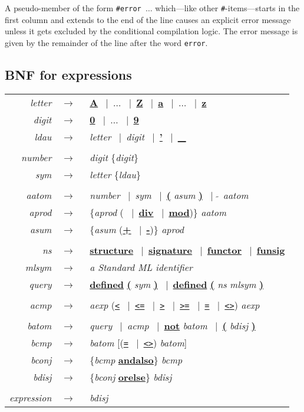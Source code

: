 \documentclass{article}
\newcommand{\nt}[1]{{\it #1}}
\newcommand{\tl}[1]{{\underline{\bf #1}}}
\newcommand{\ttl}[1]{{\underline{\tt #1}}}
\newcommand{\ar}{$\rightarrow$\ }
\newcommand{\vb}{~$|$~}
\begin{document}
A pseudo-member of the form {\tt \#error $\ldots$} which---like other
{\tt \#}-items---starts in the first column and extends to the end of
the line causes an explicit error message unless it gets excluded by
the conditional compilation logic.  The error message is given by the
remainder of the line after the word {\tt error}.

\subsection{BNF for expressions}

\begin{tabular}{rcl}
\nt{letter} &\ar& \tl{A} \vb $\ldots$ \vb \tl{Z} \vb \tl{a} \vb $\ldots$ \vb \tl{z} \\
\nt{digit}  &\ar& \tl{0} \vb $\ldots$ \vb \tl{9} \\
\nt{ldau}   &\ar& \nt{letter} \vb \nt{digit} \vb \tl{'} \vb \tl{\_} \\
\\
\nt{number} &\ar& \nt{digit} \{\nt{digit}\} \\
\nt{sym}    &\ar& \nt{letter} \{\nt{ldau}\} \\
\\
\nt{aatom}  &\ar& \nt{number} \vb \nt{sym} \vb \tl{(} \nt{asum} \tl{)} \vb \tl{$\tilde{~}$} \nt{aatom} \\
\nt{aprod}  &\ar& \{\nt{aprod} (\tl{*} \vb \tl{div} \vb \tl{mod})\} \nt{aatom} \\
\nt{asum}   &\ar& \{\nt{asum} (\tl{+} \vb \tl{-})\} \nt{aprod} \\
\\
\nt{ns}     &\ar& \tl{structure} \vb \tl{signature} \vb \tl{functor} \vb \tl{funsig} \\
\nt{mlsym}  &\ar& {\em a Standard ML identifier} \\
\nt{query}  &\ar& \tl{defined} \tl{(} \nt{sym} \tl{)} \vb \tl{defined} \tl{(} \nt{ns} \nt{mlsym} \tl{)} \\
\\
\nt{acmp}   &\ar& \nt{aexp} (\ttl{<} \vb \ttl{<=} \vb \ttl{>} \vb \ttl{>=} \vb \ttl{=} \vb \ttl{<>}) \nt{aexp} \\
\\
\nt{batom}  &\ar& \nt{query} \vb \nt{acmp} \vb \tl{not} \nt{batom} \vb \tl{(} \nt{bdisj} \tl{)} \\
\nt{bcmp}   &\ar& \nt{batom} [(\ttl{=} \vb \ttl{<>}) \nt{batom}] \\
\nt{bconj}  &\ar& \{\nt{bcmp} \tl{andalso}\} \nt{bcmp} \\
\nt{bdisj}  &\ar& \{\nt{bconj} \tl{orelse}\} \nt{bdisj} \\
\\
\nt{expression} &\ar& \nt{bdisj}
\end{tabular}
\end{document}
